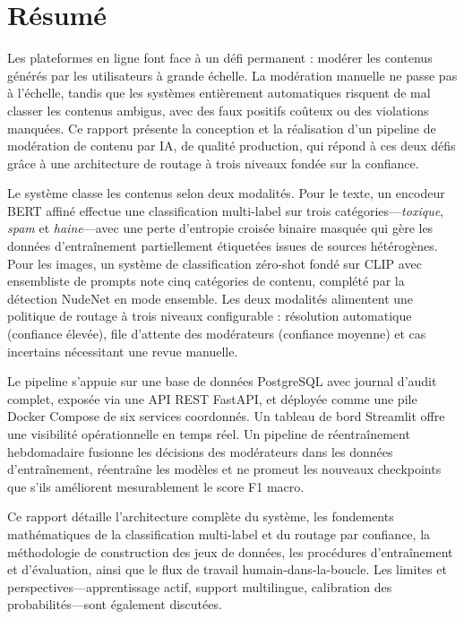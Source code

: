 \chapter*{Résumé}

Les plateformes en ligne font face à un défi permanent : modérer les contenus générés par les utilisateurs à grande échelle. La modération manuelle ne passe pas à l'échelle, tandis que les systèmes entièrement automatiques risquent de mal classer les contenus ambigus, avec des faux positifs coûteux ou des violations manquées. Ce rapport présente la conception et la réalisation d'un pipeline de modération de contenu par IA, de qualité production, qui répond à ces deux défis grâce à une architecture de routage à trois niveaux fondée sur la confiance.

Le système classe les contenus selon deux modalités. Pour le texte, un encodeur BERT affiné effectue une classification multi-label sur trois catégories---\emph{toxique}, \emph{spam} et \emph{haine}---avec une perte d'entropie croisée binaire masquée qui gère les données d'entraînement partiellement étiquetées issues de sources hétérogènes. Pour les images, un système de classification zéro-shot fondé sur CLIP avec ensembliste de prompts note cinq catégories de contenu, complété par la détection NudeNet en mode ensemble. Les deux modalités alimentent une politique de routage à trois niveaux configurable : résolution automatique (confiance élevée), file d'attente des modérateurs (confiance moyenne) et cas incertains nécessitant une revue manuelle.

Le pipeline s'appuie sur une base de données PostgreSQL avec journal d'audit complet, exposée via une API REST FastAPI, et déployée comme une pile Docker Compose de six services coordonnés. Un tableau de bord Streamlit offre une visibilité opérationnelle en temps réel. Un pipeline de réentraînement hebdomadaire fusionne les décisions des modérateurs dans les données d'entraînement, réentraîne les modèles et ne promeut les nouveaux checkpoints que s'ils améliorent mesurablement le score F1 macro.

Ce rapport détaille l'architecture complète du système, les fondements mathématiques de la classification multi-label et du routage par confiance, la méthodologie de construction des jeux de données, les procédures d'entraînement et d'évaluation, ainsi que le flux de travail humain-dans-la-boucle. Les limites et perspectives---apprentissage actif, support multilingue, calibration des probabilités---sont également discutées.
